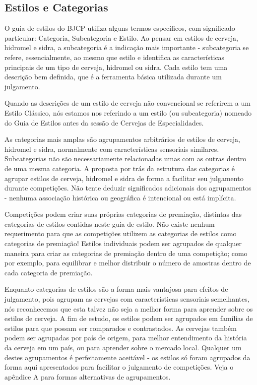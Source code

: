 \subsection*{Estilos e Categorias}
O guia de estilos do BJCP utiliza alguns termos específicos, com significado particular: Categoria, Subcategoria e Estilo. Ao pensar em estilos de cerveja, hidromel e sidra, a subcategoria é a indicação mais importante - subcategoria se refere, essencialmente, ao mesmo que estilo e identifica as características principais de um tipo de cerveja, hidromel ou sidra. Cada estilo tem uma descrição bem definida, que é a ferramenta básica utilizada durante um julgamento.

Quando as descrições de um estilo de cerveja não convencional se referirem a um Estilo Clássico, nós estamos nos referindo a um estilo (ou subcategoria) nomeado do Guia de Estilos antes da sessão de Cervejas de Especialidades.

As categorias mais amplas são agrupamentos arbitrários de estilos de cerveja, hidromel e sidra, normalmente com características sensoriais similares. Subcategorias não são necessariamente relacionadas umas com as outras dentro de uma mesma categoria. A proposta por trás da estrutura das categorias é agrupar estilos de cerveja, hidromel e sidra de forma a facilitar seu julgamento durante competições. Não tente deduzir significados adicionais dos agrupamentos - nenhuma associação histórica ou geográfica é intencional ou está implícita.

Competições podem criar suas próprias categorias de premiação, distintas das categorias de estilos contidas neste guia de estilo. Não existe nenhum requerimento para que as competições utilizem as categorias de estilos como categorias de premiação! Estilos individuais podem ser agrupados de qualquer maneira para criar as categorias de premiação dentro de uma competição; como por exemplo, para equilibrar e melhor distribuir o número de amostras dentro de cada categoria de premiação.

Enquanto categorias de estilos são a forma mais vantajosa para efeitos de julgamento, pois agrupam as cervejas com características sensoriais semelhantes, nós reconhecemos que esta talvez não seja a melhor forma para aprender sobre os estilos de cerveja. A fim de estudo, os estilos podem ser agrupados em famílias de estilos para que possam ser comparados e contrastados. As cervejas também podem ser agrupadas por país de origem, para melhor entendimento da história da cerveja em um país, ou para aprender sobre o mercado local. Qualquer um destes agrupamentos é perfeitamente aceitável - os estilos só foram agrupados da forma aqui apresentados para facilitar o julgamento de competições. Veja o apêndice A para formas alternativas de agrupamentos.

